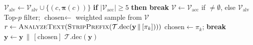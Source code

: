 \begin{algorithm}[H]
\begin{algorithmic}[1]
        \EndIf
        \State $\mathcal{V}_{\text{alv}} \gets
               \mathcal{V}_{\text{alv}} \cup
               \{(c, \boldsymbol{\pi}(c))\}$
        \State \textbf{if} $|\mathcal{V}_{\text{acc}}|
               \ge 5$ \textbf{then break}
    \EndFor
    \State {}
    \State $\mathcal{V} \gets
           \mathcal{V}_{\text{acc}}$ if $\neq\emptyset$,
           else $\mathcal{V}_{\text{alv}}$
        \State Top-$p$ filter;\;
               $\text{chosen} \gets$ weighted sample
               from $\mathcal{V}$
    \Else
        \State {}
                \State $r \gets \textsc{AnalyzeText}(
                       \textsc{StripPrefix}(
                       \mathcal{T}.\text{dec}(
                       \mathbf{y} \,\|\, [\pi_k])))$
                    \State $\text{chosen} \gets \pi_k$;\;
                           \textbf{break}
                \EndIf
            \EndIf
        \EndFor
    \EndIf
    \State $\mathbf{y} \gets \mathbf{y} \,\|\,
           [\text{chosen}]$
\EndWhile
\State \Return $\mathcal{T}.\text{dec}(\mathbf{y})$
\end{algorithmic}
\end{algorithm}



